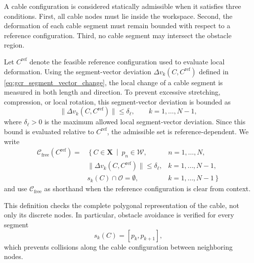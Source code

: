 \documentclass{pas}
\begin{document}
A cable configuration is considered statically admissible when it satisfies three conditions. First, all cable nodes must lie inside the workspace. Second, the deformation of each cable segment must remain bounded with respect to a reference configuration. Third, no cable segment may intersect the obstacle region.

Let \(C^{\mathrm{ref}}\) denote the feasible reference configuration used to
evaluate local deformation. Using the segment-vector deviation
\(\Delta v_k(C,C^{\mathrm{ref}})\) defined in
\eqref{eq:gcr_segment_vector_change}, the local change of a cable segment is
measured in both length and direction. To prevent excessive stretching,
compression, or local rotation, this segment-vector deviation is bounded as
\begin{equation}
\|\Delta v_k(C, C^{\mathrm{ref}})\|
\leq
\delta_{\ell},
\qquad
k=1,\ldots,N-1,
\label{eq:segment_vector_displacement_bound}
\end{equation}
where \(\delta_{\ell}>0\) is the maximum allowed local segment-vector deviation. Since this bound is evaluated relative to \(C^{\mathrm{ref}}\), the admissible set is reference-dependent. We write
\begin{equation}
\begin{aligned}
\mathcal{C}_{\mathrm{free}}(C^{\mathrm{ref}})
= &
\left\{
C\in\mathbf{X}
\ \middle|\
\right.
p_n\in\mathcal{W},
& n=1,\ldots,N,
\\
&
\|\Delta  v_k(C, C^{\mathrm{ref}})\|
\leq
\delta_{\ell},
& k=1,\ldots,N-1,
\\
&
s_k(C)\cap\mathcal{O}=\emptyset,
& \left. k=1,\ldots,N-1
\right\}
\end{aligned}
\label{eq:collision_free_configuration_space}
\end{equation}
and use \(\mathcal{C}_{\mathrm{free}}\) as shorthand when the reference
configuration is clear from context.

This definition checks the complete polygonal representation of the cable, not only its discrete nodes. In particular, obstacle avoidance is verified for every segment
\[
s_k(C)=[p_k,p_{k+1}],
\]
which prevents collisions along the cable configuration between neighboring nodes.
\end{document}
